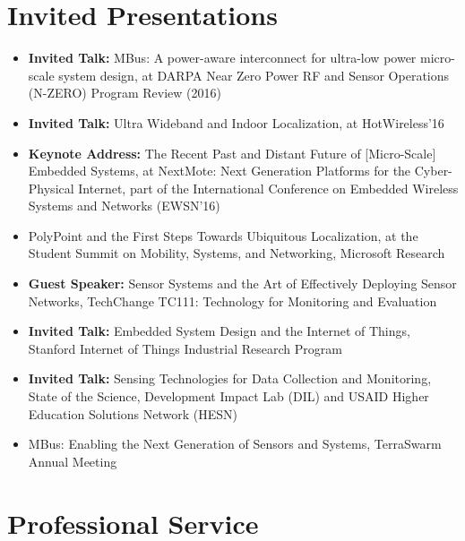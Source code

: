 \documentclass{article}
\begin{document}
\section*{Invited Presentations}

\begin{itemize}
  \item[] \textbf{Invited Talk:} MBus: A power-aware interconnect for ultra-low power micro-scale system design, at DARPA Near Zero Power RF and Sensor Operations (N-ZERO) Program Review (2016)
  \item[] \textbf{Invited Talk:} Ultra Wideband and Indoor Localization, at HotWireless'16
  \item[] \textbf{Keynote Address:} The Recent Past and Distant Future of [Micro-Scale] Embedded Systems, at NextMote: Next Generation Platforms for the Cyber-Physical Internet,
    part of the International Conference on Embedded Wireless Systems and Networks (EWSN'16)
  \item[] PolyPoint and the First Steps Towards Ubiquitous Localization, at the Student Summit on Mobility, Systems, and Networking, Microsoft Research
  \item[] \textbf{Guest Speaker:} Sensor Systems and the Art of Effectively Deploying Sensor Networks, TechChange TC111: Technology for Monitoring and Evaluation
  \item[] \textbf{Invited Talk:} Embedded System Design and the Internet of Things, Stanford Internet of Things Industrial Research Program
  \item[] \textbf{Invited Talk:} Sensing Technologies for Data Collection and Monitoring, State of the Science, Development Impact Lab (DIL) and USAID Higher Education Solutions Network (HESN)
  \item[] MBus: Enabling the Next Generation of Sensors and Systems, TerraSwarm Annual Meeting
\end{itemize}




\section*{Professional Service}
\end{document}
